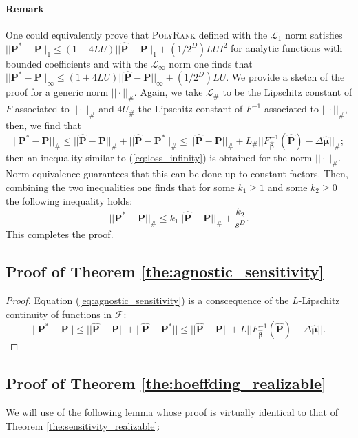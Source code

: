 \documentclass[twoside,11pt]{article}
\begin{document}
\paragraph{Remark} One could equivalently prove that \textsc{PolyRank} defined with the $\mathcal{L}_1$ norm satisfies $||\boldsymbol{P^*} - \boldsymbol{P}||_1\leq (1+4LU)||\boldsymbol{\hat{P}} - \boldsymbol{P}||_1  + (1/2^D)LUI^2$ for analytic functions with bounded coefficients and with the $\mathcal{L}_{\infty}$ norm one finds that $||\boldsymbol{P^*} - \boldsymbol{P}||_{\infty}\leq (1+4LU)||\boldsymbol{\hat{P}} - \boldsymbol{P}||_{\infty}  + (1/2^D)LU$.  We provide a sketch of the proof for a generic norm $||\cdot||_{\#}$. Again, we take $\mathcal{L}_{\#}$ to  be the Lipschitz constant of $F$ associated to $||\cdot||_{\#}$ and $4U_{\#}$ the Lipschitz constant of $F^{-1}$ associated to $||\cdot||_{\#}$, then, we find that
$$||\boldsymbol{P}^* - \boldsymbol{P}||_{\#} \leq ||\boldsymbol{\hat P} - \boldsymbol{P}||_{\#}+||\boldsymbol{\hat P} - \boldsymbol{P}^*||_{\#} \leq ||\boldsymbol{\hat P} - \boldsymbol{P}||_{\#}+L_{\#}||F^{-1}_{\boldsymbol{\hat \beta}}(\boldsymbol{\hat P}) - \Delta \boldsymbol{\hat \mu}||_{\#}; $$
then an inequality similar to (\ref{eq:loss_infinity}) is obtained for the norm $||\cdot||_{\#}$. Norm equivalence  guarantees that this can be done up to constant factors. Then, combining the two inequalities one finds that for some $k_1\geq 1$ and some $k_2\geq 0$ the following inequality holds:
$$||\boldsymbol{P}^* - \boldsymbol{P}||_{\#}\leq k_1||\hat{\boldsymbol{P}} - \boldsymbol{P}||_{\#} + \frac{k_2}{s^D}.$$
This completes the proof.
\subsection{Proof of Theorem \ref{the:agnostic_sensitivity}}
\label{sec:proof_agnostic_sensitivity}
\begin{proof} Equation (\ref{eq:agnostic_sensitivity}) is a conscequence of the  $L$-Lipschitz continuity of functions in $\mathcal{F}$:
$$||\boldsymbol{P}^* - \boldsymbol{P}|| \leq ||\boldsymbol{\hat P} - \boldsymbol{P}||+||\boldsymbol{\hat P} - \boldsymbol{P}^*|| \leq ||\boldsymbol{\hat P} - \boldsymbol{P}||+L||F^{-1}_{\boldsymbol{\hat \beta}}(\boldsymbol{\hat P}) - \Delta \boldsymbol{\hat \mu}||. $$
\end{proof}
\subsection{Proof of Theorem \ref{the:hoeffding_realizable}}
We will use of the following lemma whose proof is virtually identical to that of Theorem \ref{the:sensitivity_realizable}:
\end{document}
